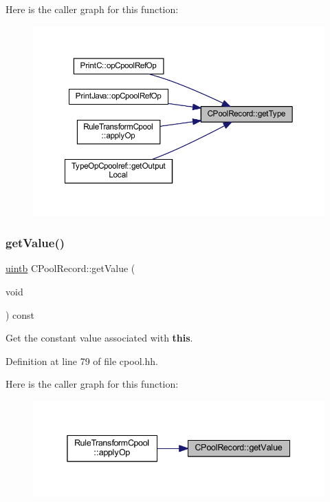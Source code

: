 Here is the caller graph for this function\+:
\nopagebreak
\begin{figure}[H]
\begin{center}
\leavevmode
\includegraphics[width=350pt]{class_c_pool_record_ad6af01c246cf40ac83fb54fe7df981dd_icgraph}
\end{center}
\end{figure}
\mbox{\label{class_c_pool_record_aaded70e1f90975f5a2115f98bcfae466}} 
\subsubsection{\texorpdfstring{getValue()}{getValue()}}
{\footnotesize\ttfamily \mbox{\hyperlink{types_8h_a2db313c5d32a12b01d26ac9b3bca178f}{uintb}} C\+Pool\+Record\+::get\+Value (\begin{DoxyParamCaption}\item[{void}]{ }\end{DoxyParamCaption}) const\hspace{0.3cm}{\ttfamily [inline]}}



Get the constant value associated with {\bfseries{this}}. 



Definition at line 79 of file cpool.\+hh.

Here is the caller graph for this function\+:
\nopagebreak
\begin{figure}[H]
\begin{center}
\leavevmode
\includegraphics[width=338pt]{class_c_pool_record_aaded70e1f90975f5a2115f98bcfae466_icgraph}
\end{center}
\end{figure}
\mbox{\label{class_c_pool_record_aed45b0c5aa82d79039282045a43ee3d9}} 
